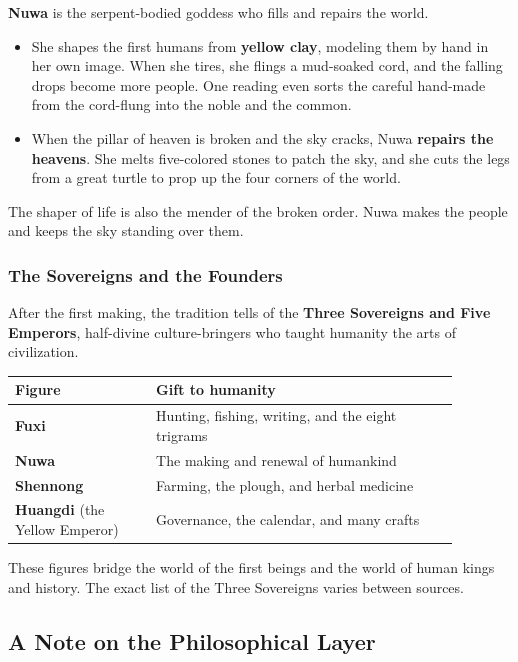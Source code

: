 \textbf{Nuwa} is the serpent-bodied goddess who fills and repairs the world.

\begin{itemize}
 \item She shapes the first humans from \textbf{yellow clay}, modeling them by hand in her own image. When she tires, she flings a mud-soaked cord, and the falling drops become more people. One reading even sorts the careful hand-made from the cord-flung into the noble and the common.
 \item When the pillar of heaven is broken and the sky cracks, Nuwa \textbf{repairs the heavens}. She melts five-colored stones to patch the sky, and she cuts the legs from a great turtle to prop up the four corners of the world.
\end{itemize}

The shaper of life is also the mender of the broken order. Nuwa makes the people and keeps the sky standing over them.

\subsubsection{The Sovereigns and the Founders}

After the first making, the tradition tells of the \textbf{Three Sovereigns and Five Emperors}, half-divine culture-bringers who taught humanity the arts of civilization.

\begin{longtable}{L{0.28\linewidth}
L{0.6\linewidth}}
\toprule
\textbf{Figure} & \textbf{Gift to humanity} \\
\midrule
\textbf{Fuxi} & Hunting, fishing, writing, and the eight trigrams \\
\textbf{Nuwa} & The making and renewal of humankind \\
\textbf{Shennong} & Farming, the plough, and herbal medicine \\
\textbf{Huangdi} (the Yellow Emperor) & Governance, the calendar, and many crafts \\
\bottomrule
\end{longtable}

These figures bridge the world of the first beings and the world of human kings and history. The exact list of the Three Sovereigns varies between sources.

\subsection{A Note on the Philosophical Layer}

